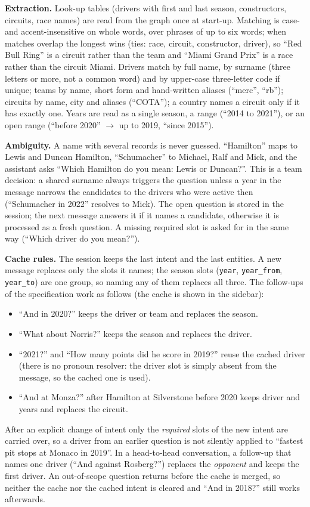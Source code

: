 \documentclass[10pt,a4paper]{article}
\newcommand{\code}[1]{\texttt{#1}}
\begin{document}
\textbf{Extraction.} Look-up tables (drivers with first and last season, constructors, circuits, race names) are read from the graph once at start-up. Matching is case- and accent-insensitive on whole words, over phrases of up to six words; when matches overlap the longest wins (ties: race, circuit, constructor, driver), so ``Red Bull Ring'' is a circuit rather than the team and ``Miami Grand Prix'' is a race rather than the circuit Miami. Drivers match by full name, by surname (three letters or more, not a common word) and by upper-case three-letter code if unique; teams by name, short form and hand-written aliases (``merc'', ``rb''); circuits by name, city and aliases (``COTA''); a country names a circuit only if it has exactly one. Years are read as a single season, a range (``2014 to 2021''), or an open range (``before 2020'' $\rightarrow$ up to 2019, ``since 2015'').

\textbf{Ambiguity.} A name with several records is never guessed. ``Hamilton'' maps to Lewis and Duncan Hamilton, ``Schumacher'' to Michael, Ralf and Mick, and the assistant asks ``Which Hamilton do you mean: Lewis or Duncan?''. This is a team decision: a shared surname always triggers the question unless a year in the message narrows the candidates to the drivers who were active then (``Schumacher in 2022'' resolves to Mick). The open question is stored in the session; the next message answers it if it names a candidate, otherwise it is processed as a fresh question. A missing required slot is asked for in the same way (``Which driver do you mean?'').

\textbf{Cache rules.} The session keeps the last intent and the last entities. A new message replaces only the slots it names; the season slots (\code{year}, \code{year\_from}, \code{year\_to}) are one group, so naming any of them replaces all three. The follow-ups of the specification work as follows (the cache is shown in the sidebar):
\begin{itemize}
\item ``And in 2020?'' keeps the driver or team and replaces the season.
\item ``What about Norris?'' keeps the season and replaces the driver.
\item ``2021?'' and ``How many points did he score in 2019?'' reuse the cached driver (there is no pronoun resolver: the driver slot is simply absent from the message, so the cached one is used).
\item ``And at Monza?'' after Hamilton at Silverstone before 2020 keeps driver and years and replaces the circuit.
\end{itemize}
After an explicit change of intent only the \emph{required} slots of the new intent are carried over, so a driver from an earlier question is not silently applied to ``fastest pit stops at Monaco in 2019''. In a head-to-head conversation, a follow-up that names one driver (``And against Rosberg?'') replaces the \emph{opponent} and keeps the first driver. An out-of-scope question returns before the cache is merged, so neither the cache nor the cached intent is cleared and ``And in 2018?'' still works afterwards.
\end{document}
